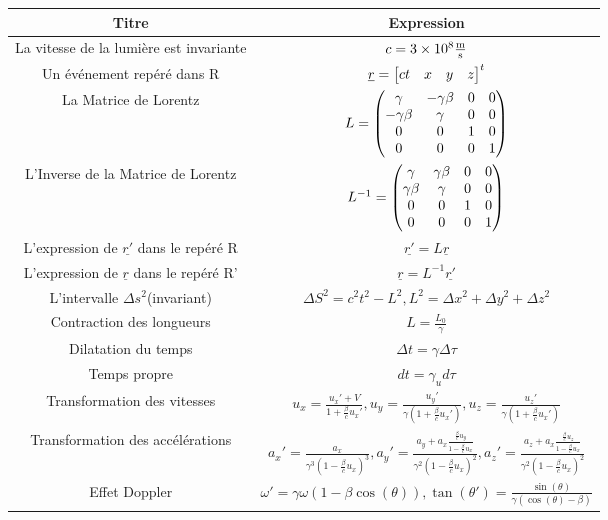 \documentclass[french]{article}
\begin{document}
	\begin{center}
		\begin{tabular}{| c | c |}
			\hline
			\textbf{Titre} & \textbf{Expression}\\
			\hline
			La vitesse de la lumière est invariante&$c = 3\times10^8 \si{\frac{\meter}{\second}}$\\
			\hline
			Un événement repéré dans R&$ \underline{r}=\mqty[c t& x&y&z]^t $ \\
			\hline
			La Matrice de Lorentz &$L = \mqty(\gamma & -\gamma\beta & 0 & 0 \\ -\gamma\beta& \gamma&0&0\\0&0&1&0\\0&0&0&1)$\\
			\hline
			L'Inverse de la Matrice de Lorentz&$L^{-1} = \mqty(\gamma & \gamma\beta & 0 & 0 \\ \gamma\beta& \gamma&0&0\\0&0&1&0\\0&0&0&1)$\\
			\hline
			L'expression de $\underline{r'}$ dans le repéré R&$\underline{r'}=L\underline{r}$\\
			\hline
			L'expression de $\underline{r}$ dans le repéré R' &$\underline{r}=L^{-1}\underline{r'}$\\
			\hline
			L’intervalle $\Delta s ^2$(invariant)&$\Delta S^2=c^2t^2-L^2, L^2=\Delta x ^2 +\Delta y ^2 + \Delta z ^2$\\
		\hline
		Contraction des longueurs&$L=\frac{L_0}{\gamma}$\\
		\hline
		Dilatation du temps&$\Delta t = \gamma \Delta \tau$ \\
		\hline
		Temps propre& $dt=\gamma_ud\tau$\\
		\hline
		Transformation des vitesses&$u_x = \frac{u_x'+V}{1 +\frac{\beta}{c}u_x'},
				 u_y = \frac{u_y'}{\gamma(1 +\frac{\beta}{c}u_x')}, 
				 u_z = \frac{u_z'}{\gamma(1 +\frac{\beta}{c}u_x')}$\\
		\hline
Transformation des accélérations&
	$a_x' = \frac{a_x}{\gamma^3\left(1 - \frac{\beta}{c}u_x\right)^3},
	a_y' = \frac{a_y + a_x \frac{\frac{\beta}{c}u_y}{1-\frac{\beta}{c}u_x}}{\gamma ^2\left(1-\frac{\beta}{c}u_x\right)^2}, 
		a_z' = \frac{a_z + a_x \frac{\frac{\beta}{c}u_z}{1-\frac{\beta}{c}u_x}}{\gamma ^2\left(1-\frac{\beta}{c}u_x\right)^2}$	
\\
\hline
Effet Doppler&$\omega'=\gamma\omega\left(1-\beta\cos(\theta)\right),
	\tan(\theta')= \frac{\sin(\theta)}{\gamma\left(\cos(\theta)-\beta\right)}$\\

\end{tabular}
\end{center}
\end{document}
